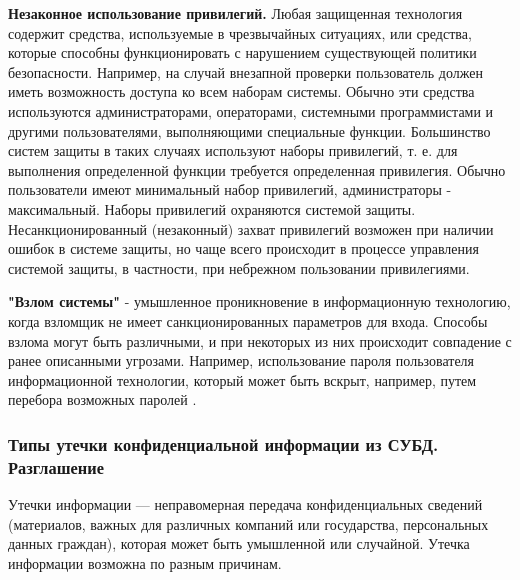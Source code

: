 \textbf{Незаконное использование привилегий.} Любая защищенная технология содержит
средства, используемые в чрезвычайных ситуациях, или средства, которые способны
функционировать с нарушением существующей политики безопасности. Например, на случай
внезапной проверки пользователь должен иметь возможность доступа ко всем наборам
системы. Обычно эти средства используются администраторами, операторами, системными
программистами и другими пользователями, выполняющими специальные функции.
Большинство систем защиты в таких случаях используют наборы привилегий, т. е. для
выполнения определенной функции требуется определенная привилегия. Обычно
пользователи имеют минимальный набор привилегий, администраторы - максимальный.
Наборы привилегий охраняются системой защиты. Несанкционированный (незаконный)
захват привилегий возможен при наличии ошибок в системе защиты, но чаще всего
происходит в процессе управления системой защиты, в частности, при небрежном
пользовании привилегиями.

\textbf{"Взлом системы"} - умышленное проникновение в информационную технологию, когда взломщик не
имеет санкционированных параметров для входа. Способы взлома могут быть различными, и при некоторых
из них происходит совпадение с ранее описанными угрозами. Например, использование пароля пользователя
информационной технологии, который может быть вскрыт, например, путем перебора возможных паролей \cite{system-hack}.


\subsubsection{Типы утечки конфиденциальной информации из СУБД. Разглашение}

Утечки информации — неправомерная передача конфиденциальных сведений (материалов, важных для различных
компаний или государства, персональных данных граждан), которая может быть умышленной или случайной.
Утечка информации возможна по разным причинам.

